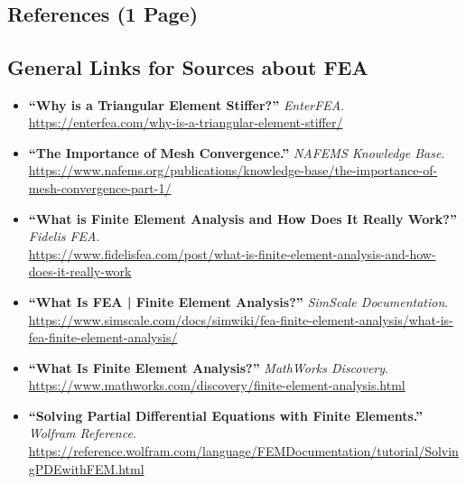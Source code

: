 \documentclass[11pt]{article}
\begin{document}
\begin{onehalfspace}
\end{onehalfspace}

\vspace{15cm}\
{
\small
\subsection*{References (1 Page)}
    \subsection*{General Links for Sources about FEA}

    \begin{itemize}
        \item \textbf{``Why is a Triangular Element Stiffer?''} \textit{EnterFEA}. \\ 
        \url{https://enterfea.com/why-is-a-triangular-element-stiffer/}
        
        \item \textbf{``The Importance of Mesh Convergence.''} \textit{NAFEMS Knowledge Base}. \\ 
        \url{https://www.nafems.org/publications/knowledge-base/the-importance-of-mesh-convergence-part-1/}
        
        \item \textbf{``What is Finite Element Analysis and How Does It Really Work?''} \textit{Fidelis FEA}. \\ 
        \url{https://www.fidelisfea.com/post/what-is-finite-element-analysis-and-how-does-it-really-work}
        
        \item \textbf{``What Is FEA | Finite Element Analysis?''} \textit{SimScale Documentation}. \\ 
        \url{https://www.simscale.com/docs/simwiki/fea-finite-element-analysis/what-is-fea-finite-element-analysis/}
        
        \item \textbf{``What Is Finite Element Analysis?''} \textit{MathWorks Discovery}. \\ 
        \url{https://www.mathworks.com/discovery/finite-element-analysis.html}
        
        \item \textbf{``Solving Partial Differential Equations with Finite Elements.''} \textit{Wolfram Reference}. \\ 
        \url{https://reference.wolfram.com/language/FEMDocumentation/tutorial/SolvingPDEwithFEM.html}
      

\end{itemize}}
\end{document}
